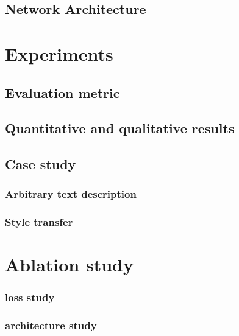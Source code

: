 \documentclass[10pt,twocolumn,letterpaper]{article}
\begin{document}
\subsection{Network Architecture}

\section{Experiments}
\subsection{Evaluation metric}
\subsection{Quantitative and qualitative results}

\subsection{Case study}
\subsubsection{Arbitrary text description}
\subsubsection{Style transfer}

\section{Ablation study}
\subsubsection{loss study}
\subsubsection{architecture study}



{\small


}
\end{document}
